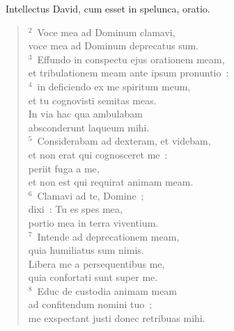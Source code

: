 ~\lettrine[lines=10,image=true,loversize=0.05,lraise=-0.03]{I}{}ntellectus David, cum esset in spelunca, oratio.
\begin{flushleft}\begin{verse}\vspace{6pt}${}^{2}$~Voce mea ad Dominum clamavi,\\ voce mea ad Dominum deprecatus sum.\\
${}^{3}$~Effundo in conspectu ejus orationem meam,\\ et tribulationem meam ante ipsum pronuntio~:\\
${}^{4}$~in deficiendo ex me spiritum meum,\\ et tu cognovisti semitas meas.\\ In via hac qua ambulabam\\ absconderunt laqueum mihi.\\
${}^{5}$~Considerabam ad dexteram, et videbam,\\ et non erat qui cognosceret me~:\\ periit fuga a me,\\ et non est qui requirat animam meam.\\
${}^{6}$~Clamavi ad te, Domine~;\\ dixi~: Tu es spes mea,\\ portio mea in terra viventium.\\
${}^{7}$~Intende ad deprecationem meam,\\ quia humiliatus sum nimis.\\ Libera me a persequentibus me,\\ quia confortati sunt super me.\\
${}^{8}$~Educ de custodia animam meam\\ ad confitendum nomini tuo~;\\ me exspectant justi donec retribuas mihi.\end{verse}\end{flushleft}


